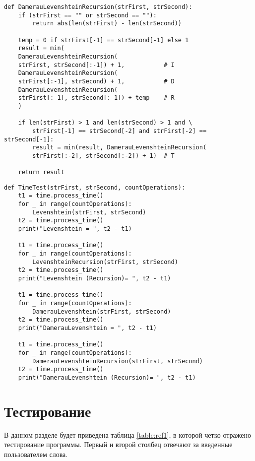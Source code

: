 \begin{lstlisting}[label=some-code,caption=Рекурсивная функция нахождения расстояния Дамерау-Левенштейна]
def DamerauLevenshteinRecursion(strFirst, strSecond):
	if (strFirst == "" or strSecond == ""):
		return abs(len(strFirst) - len(strSecond))
	
	temp = 0 if strFirst[-1] == strSecond[-1] else 1
	result = min(
	DamerauLevenshteinRecursion(
	strFirst, strSecond[:-1]) + 1,           # I
	DamerauLevenshteinRecursion(
	strFirst[:-1], strSecond) + 1,           # D
	DamerauLevenshteinRecursion(
	strFirst[:-1], strSecond[:-1]) + temp    # R
	)
	
	if len(strFirst) > 1 and len(strSecond) > 1 and \
		strFirst[-1] == strSecond[-2] and strFirst[-2] == strSecond[-1]:
		result = min(result, DamerauLevenshteinRecursion(
		strFirst[:-2], strSecond[:-2]) + 1)  # T
	
	return result
\end{lstlisting}

\begin{lstlisting}[label=some-code,caption=функция замера времени]
def TimeTest(strFirst, strSecond, countOperations):
	t1 = time.process_time()
	for _ in range(countOperations):
		Levenshtein(strFirst, strSecond)
	t2 = time.process_time()
	print("Levenshtein = ", t2 - t1)
	
	t1 = time.process_time()
	for _ in range(countOperations):
		LevenshteinRecursion(strFirst, strSecond)
	t2 = time.process_time()
	print("Levenshtein (Recursion)= ", t2 - t1)
	
	t1 = time.process_time()
	for _ in range(countOperations):
		DamerauLevenshtein(strFirst, strSecond)
	t2 = time.process_time()
	print("DamerauLevenshtein = ", t2 - t1)
	
	t1 = time.process_time()
	for _ in range(countOperations):
		DamerauLevenshteinRecursion(strFirst, strSecond)
	t2 = time.process_time()
	print("DamerauLevenshtein (Recursion)= ", t2 - t1)
\end{lstlisting}


\section{Тестирование}

В данном разделе будет приведена таблица \ref{table:ref1}, в которой четко отражено тестирование программы. Первый и второй столбец отвечают за введенные пользователем слова.\\

